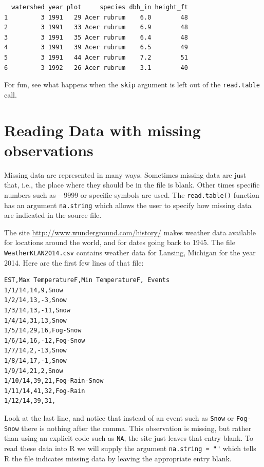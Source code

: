 \documentclass[]{krantz}
\begin{document}
\begin{verbatim}
  watershed year plot     species dbh_in height_ft
1         3 1991   29 Acer rubrum    6.0        48
2         3 1991   33 Acer rubrum    6.9        48
3         3 1991   35 Acer rubrum    6.4        48
4         3 1991   39 Acer rubrum    6.5        49
5         3 1991   44 Acer rubrum    7.2        51
6         3 1992   26 Acer rubrum    3.1        40
\end{verbatim}

For fun, see what happens when the \texttt{skip} argument is left out of the \texttt{read.table} call.

\hypertarget{reading-data-with-missing-observations}{%
\section{Reading Data with missing observations}\label{reading-data-with-missing-observations}}

Missing data are represented in many ways. Sometimes missing data are just that, i.e., the place where they should be in the file is blank. Other times specific numbers such as \(-9999\) or specific symbols are used. The \texttt{read.table()} function has an argument \texttt{na.string} which allows the user to specify how missing data are indicated in the source file.

The site \url{http://www.wunderground.com/history/} makes weather data available for locations around the world, and for dates going back to 1945. The file \texttt{WeatherKLAN2014.csv} contains weather data for Lansing, Michigan for the year 2014. Here are the first few lines of that file:

\begin{verbatim}
EST,Max TemperatureF,Min TemperatureF, Events
1/1/14,14,9,Snow
1/2/14,13,-3,Snow
1/3/14,13,-11,Snow
1/4/14,31,13,Snow
1/5/14,29,16,Fog-Snow
1/6/14,16,-12,Fog-Snow
1/7/14,2,-13,Snow
1/8/14,17,-1,Snow
1/9/14,21,2,Snow
1/10/14,39,21,Fog-Rain-Snow
1/11/14,41,32,Fog-Rain
1/12/14,39,31,
\end{verbatim}

Look at the last line, and notice that instead of an event such as \texttt{Snow} or \texttt{Fog-Snow} there is nothing after the comma. This observation is missing, but rather than using an explicit code such as \texttt{NA}, the site just leaves that entry blank. To read these data into R we will supply the argument \texttt{na.string\ =\ ""} which tells R the file indicates missing data by leaving the appropriate entry blank.
\end{document}
